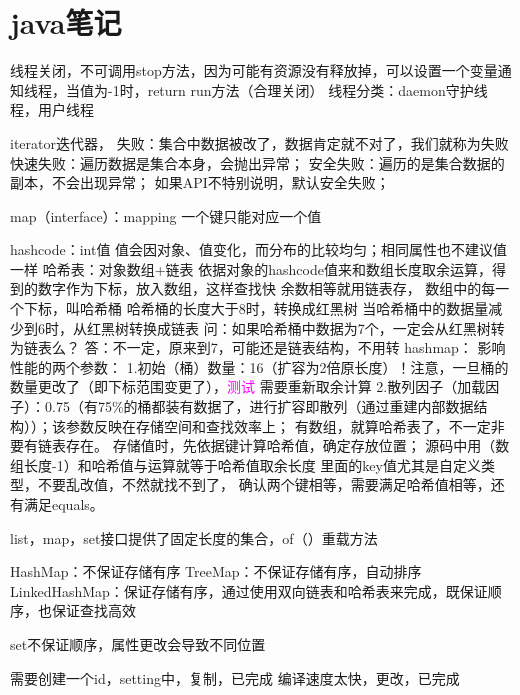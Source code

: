 \documentclass[utf8]{ctexart}
\begin{document}
    \section{java笔记}
    线程关闭，不可调用stop方法，因为可能有资源没有释放掉，可以设置一个变量通知线程，当值为-1时，return run方法（合理关闭）
    线程分类：daemon守护线程，用户线程

    iterator迭代器，
    失败：集合中数据被改了，数据肯定就不对了，我们就称为失败
        快速失败：遍历数据是集合本身，会抛出异常；
        安全失败：遍历的是集合数据的副本，不会出现异常；
        如果API不特别说明，默认安全失败；

    map（interface）：mapping
        一个键只能对应一个值

    hashcode：int值
            值会因对象、值变化，而分布的比较均匀；相同属性也不建议值一样
    哈希表：对象数组+链表
        依据对象的hashcode值来和数组长度取余运算，得到的数字作为下标，放入数组，这样查找快
        余数相等就用链表存，
        数组中的每一个下标，叫哈希桶
        哈希桶的长度大于8时，转换成红黑树
        当哈希桶中的数据量减少到6时，从红黑树转换成链表
            问：如果哈希桶中数据为7个，一定会从红黑树转为链表么？
                答：不一定，原来到7，可能还是链表结构，不用转
    hashmap： 
        影响性能的两个参数：
            1.初始（桶）数量：16（扩容为2倍原长度）！注意，一旦桶的数量更改了（即下标范围变更了），\textcolor{magenta}{测试} 需要重新取余计算
            2.散列因子（加载因子）：0.75（有75\%的桶都装有数据了，进行扩容即散列（通过重建内部数据结构））；该参数反映在存储空间和查找效率上；
        有数组，就算哈希表了，不一定非要有链表存在。
        存储值时，先依据键计算哈希值，确定存放位置；
        源码中用（数组长度-1）和哈希值与运算就等于哈希值取余长度
        里面的key值尤其是自定义类型，不要乱改值，不然就找不到了，
        确认两个键相等，需要满足哈希值相等，还有满足equals。
    

    list，map，set接口提供了固定长度的集合，of（）重载方法

    HashMap：不保证存储有序
    TreeMap：不保证存储有序，自动排序
    LinkedHashMap：保证存储有序，通过使用双向链表和哈希表来完成，既保证顺序，也保证查找高效


    set不保证顺序，属性更改会导致不同位置


    需要创建一个id，setting中，复制，已完成
    编译速度太快，更改，已完成
\end{document}
